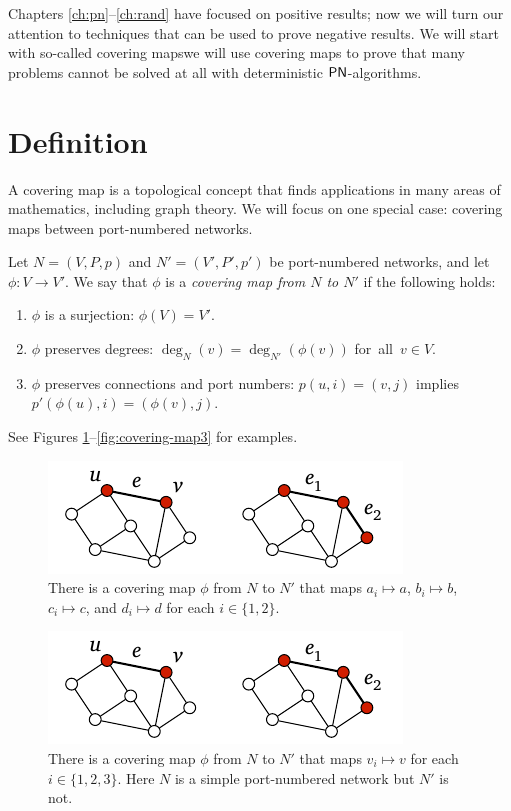 
Chapters \ref{ch:pn}--\ref{ch:rand} have focused on positive results; now we will turn our attention to techniques that can be used to prove negative results. We will start with so-called covering maps\mydash we will use covering maps to prove that many problems cannot be solved at all with deterministic $\textup{\sffamily PN}$-algorithms.

\section{Definition}

A covering map is a topological concept that finds applications in many areas of mathematics, including graph theory. We will focus on one special case: covering maps between port-numbered networks.

Let $N = (V,P,p)$ and $N' = (V'\!,P'\!,p')$ be port-numbered networks, and let $\phi \colon V \to V'$. We say that $\phi$ is a \emph{covering map from $N$ to $N'$} if the following holds:
\begin{enumerate}\raggedright
    \item $\phi$ is a surjection: $\phi(V) = V'$.
    \item $\phi$ preserves degrees: $\deg_{N}(v) = \deg_{N'}(\phi(v))$ for~all~$v \in V$.
    \item $\phi$ preserves connections and port numbers: $p(u,i) = (v,j)$ implies $p'(\phi(u),i) = (\phi(v),j)$.
\end{enumerate}
See Figures \ref{fig:covering-map}--\ref{fig:covering-map3} for examples.

\begin{figure}
    \centering
    \includegraphics[page=\PCoveringMap]{figs.pdf}
    \caption{There is a covering map $\phi$ from $N$ to $N'$ that maps $a_i \mapsto a$, $b_i \mapsto b$, $c_i \mapsto c$, and $d_i \mapsto d$ for each $i \in \{1, 2\}$.}\label{fig:covering-map}
\end{figure}

\begin{figure}
    \centering
    \includegraphics[page=\PCoveringMapB]{figs.pdf}
    \caption{There is a covering map $\phi$ from $N$ to $N'$ that maps $v_i \mapsto v$ for each $i \in \{1, 2, 3\}$. Here $N$ is a simple port-numbered network but $N'$ is not.}\label{fig:covering-map2}
\end{figure}

